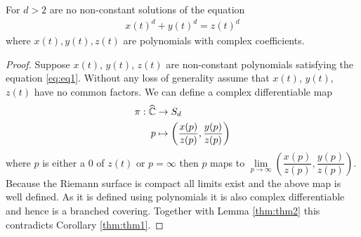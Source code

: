 \begin{thm}
	For $d>2$ are no non-constant solutions of the equation
	\begin{align}
		\label{eq:eq1}
		x(t)^d + y(t)^d = z(t)^d
	\end{align}
	where $x(t), y(t), z(t)$ are polynomials with complex coefficients.
\end{thm}
\begin{proof}
	Suppose $x(t)$, $ y(t)$, $z(t)$ are non-constant polynomials satisfying the equation \eqref{eq:eq1}. Without any loss of generality assume that $x(t)$, $ y(t)$, $z(t)$ have no common factors. We can define a complex differentiable map
	\begin{align}
		\pi : \widehat {\mathbb{C}} & \rightarrow S_d                                             \\
		p                   & \mapsto \left(\dfrac{x(p)}{z(p)}, \dfrac{y(p)}{z(p)}\right)
	\end{align}
	where $p$ is either a 0 of $z(t)$ or $p = \infty$ then $p$ maps to $\lim \limits_{p \rightarrow \infty}\left(\dfrac{x(p)}{z(p)}, \dfrac{y(p)}{z(p)}\right)$. Because the Riemann surface is compact all limits exist and the above map is well defined. As it is defined using polynomials it is also complex differentiable and hence is a branched covering. Together with Lemma \ref{thm:thm2} this contradicts Corollary \ref{thm:thm1}.
\end{proof}






